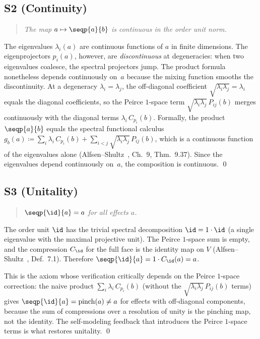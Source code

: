 \subsection*{S2 (Continuity)}

\begin{quote}
\emph{The map $a \mapsto \seqp{a}{b}$ is continuous in the order unit
norm.}
\end{quote}

The eigenvalues $\lambda_i(a)$ are continuous functions of $a$ in finite
dimensions.  The eigenprojectors $p_i(a)$, however, are
\emph{discontinuous} at degeneracies: when two eigenvalues coalesce,
the spectral projectors jump.  The product formula nonetheless depends
continuously on~$a$ because the mixing function smooths the
discontinuity.  At a degeneracy $\lambda_i = \lambda_j$, the
off-diagonal coefficient $\sqrt{\lambda_i\lambda_j} = \lambda_i$
equals the diagonal coefficients, so the Peirce $1$-space term
$\sqrt{\lambda_i\lambda_j}\, P_{ij}(b)$ merges continuously with the
diagonal terms $\lambda_i\, C_{p_i}(b)$.  Formally, the product
$\seqp{a}{b}$ equals the spectral functional calculus
$g_b(a) \coloneqq \sum_{i}\lambda_i\, C_{p_i}(b) +
\sum_{i<j}\sqrt{\lambda_i\lambda_j}\, P_{ij}(b)$, which is a
continuous function of the eigenvalues alone
(Alfsen--Shultz~\cite{AlfsenShultz2003}, Ch.~9, Thm.~9.37).
Since the eigenvalues depend continuously on~$a$, the composition is
continuous. \qed

\subsection*{S3 (Unitality)}

\begin{quote}
\emph{$\seqp{\id}{a} = a$ for all effects $a$.}
\end{quote}

The order unit $\id$ has the trivial spectral decomposition
$\id = 1\cdot\id$ (a single eigenvalue with the maximal
projective unit). The Peirce $1$-space sum is empty, and the compression
$C_{\id}$ for the full face is the identity map on $V$
(Alfsen--Shultz~\cite{AlfsenShultz2003}, Def.~7.1). Therefore
$\seqp{\id}{a} = 1 \cdot C_{\id}(a) = a$.

This is the axiom whose verification critically depends on the Peirce
$1$-space correction: the naive product $\sum_i \lambda_i\, C_{p_i}(b)$
(without the $\sqrt{\lambda_i\lambda_j}\,P_{ij}(b)$ terms) gives
$\seqp{\id}{a} = \mathrm{pinch}(a) \ne a$ for effects with
off-diagonal components, because the sum of compressions over a resolution
of unity is the pinching map, not the identity. The self-modeling feedback
that introduces the Peirce $1$-space terms is what restores unitality. \qed

